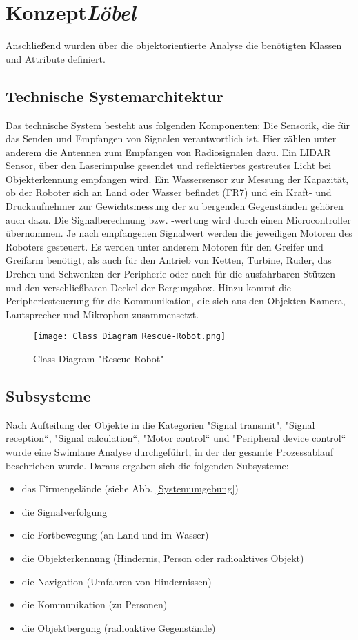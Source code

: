 \section{Konzept\hfill\textnormal{\emph{Löbel}}}
Anschließend wurden über die objektorientierte Analyse die benötigten Klassen und Attribute definiert. 

\subsection{Technische Systemarchitektur}
Das technische System besteht aus folgenden Komponenten: Die Sensorik, die für das Senden und Empfangen von Signalen verantwortlich ist. Hier zählen unter anderem die Antennen zum Empfangen von Radiosignalen dazu. Ein LIDAR Sensor, über den Laserimpulse gesendet und reflektiertes gestreutes Licht bei Objekterkennung empfangen wird. Ein Wassersensor zur Messung der Kapazität, ob der Roboter sich an Land oder Wasser befindet (FR7) und ein Kraft- und Druckaufnehmer zur Gewichtsmessung der zu bergenden Gegenständen gehören auch dazu. Die Signalberechnung bzw. -wertung wird durch einen Microcontroller übernommen. Je nach empfangenen Signalwert werden die jeweiligen Motoren des Roboters gesteuert. Es werden unter anderem Motoren für den Greifer und Greifarm benötigt, als auch für den Antrieb von Ketten, Turbine, Ruder, das Drehen und Schwenken der Peripherie oder auch für die ausfahrbaren Stützen und den verschließbaren Deckel der Bergungsbox. Hinzu kommt die Peripheriesteuerung für die Kommunikation, die sich aus den Objekten Kamera, Lautsprecher und Mikrophon zusammensetzt. 

\begin{figure}[H]
  \centering\texttt{[image: Class Diagram Rescue-Robot.png]}
  \caption{Class Diagram "Rescue Robot"}
  \label{ClassDiagram}
\end{figure}

\subsection{Subsysteme}
Nach Aufteilung der Objekte in die Kategorien "Signal transmit", "Signal reception“, "Signal calculation“, "Motor control“ und "Peripheral device control“ wurde eine Swimlane Analyse durchgeführt, in der der gesamte Prozessablauf beschrieben wurde. Daraus ergaben sich die folgenden Subsysteme: 

\begin{itemize}
\item das Firmengelände (siehe Abb. \ref{Systemumgebung})
\item die Signalverfolgung
\item die Fortbewegung (an Land und im Wasser)
\item die Objekterkennung (Hindernis, Person oder radioaktives Objekt)
\item die Navigation (Umfahren von Hindernissen)
\item die Kommunikation (zu Personen)
\item die Objektbergung (radioaktive Gegenstände)
\end{itemize}

